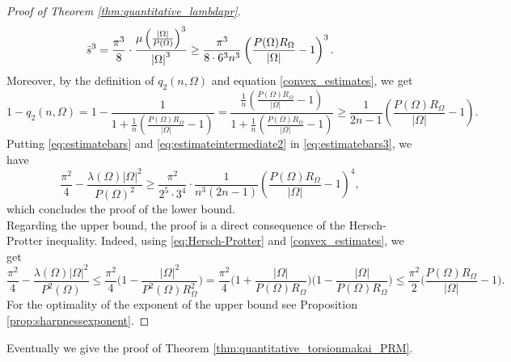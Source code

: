 \documentclass[oneside,a4paper,11pt,notitlepage]{article}
\newcommand{\abs}[1]{{\left|#1\right|}}
\theoremstyle{definition}
\theoremstyle{plain}
\theoremstyle{definition}
\begin{document}
\begin{proof}[Proof of Theorem \ref{thm:quantitative_lambdapr}]
\begin{equation}
    \Bar{s}^3=\frac{\pi^3}{8}\cdot\frac{\mu\left(\frac{\abs{\Omega}}{P(\Omega)}\right)^3}{\abs{\Omega}^3}\ge\frac{\pi^3}{8\cdot 6^3 n^3}\left(\frac{P(\Omega)R_\Omega}{|\Omega|}-1\right)^3.
\end{equation}
Moreover, by the definition of $q_2(n,\Omega)$ and equation \eqref{convex_estimates}, we get
\begin{equation}\label{eq:estimateintermediate2}
    1-q_2(n,\Omega)= 1-\frac{1}{1+\frac{1}{n}\left(\frac{P(\Omega)R_\Omega}{\abs{\Omega}}-1\right)}= \frac{\frac{1}{n}\left(\frac{P(\Omega)R_\Omega}{\abs{\Omega}}-1\right)}{1+\frac{1}{n}\left(\frac{P(\Omega)R_\Omega}{\abs{\Omega}}-1\right)}\ge \frac{1}{2n-1}\left(\frac{P(\Omega)R_\Omega}{\abs{\Omega}}-1\right).
\end{equation}
Putting  \eqref{eq:estimatebars} and \eqref{eq:estimateintermediate2} in \eqref{eq:estimatebars3}, we have
\begin{equation*}
      \frac{\pi^2}{4}-\frac{\lambda(\Omega)\abs{\Omega}^2}{P(\Omega)^2}\ge\frac{\pi^2}{2^5\cdot 3^4}\cdot\frac{1}{n^3(2n-1)}\left(\frac{P(\Omega)R_\Omega}{\abs{\Omega}}-1\right)^4,
\end{equation*}
which concludes the proof of the lower bound.\\
Regarding the upper bound, the proof is a direct consequence of the Hersch-Protter inequality.
Indeed, using \eqref{eq:Hersch-Protter} and \eqref{convex_estimates}, we get
\begin{equation*}
    \frac{\pi^2}{4} -\frac{\lambda(\Omega)\abs{\Omega}^2}{P^2(\Omega)}  \le \frac{\pi^2}{4}\bigg(1-\frac{\abs{\Omega}^2}{P^2(\Omega)R_\Omega^2}\bigg)=\frac{\pi^2}{4}\bigg(1+\frac{\abs{\Omega}}{P(\Omega)R_\Omega}\bigg)\bigg(1-\frac{\abs{\Omega}}{P(\Omega)R_\Omega}\bigg)\le \frac{\pi^2}{2}\bigg(\frac{P(\Omega)R_\Omega}{\abs{\Omega}}-1\bigg).
\end{equation*}
For the optimality of the exponent of the upper bound see Proposition \ref{prop:sharpnessexponent}.
\end{proof}

Eventually we give the proof of Theorem \ref{thm:quantitative_torsionmakai_PRM}.
\end{document}

